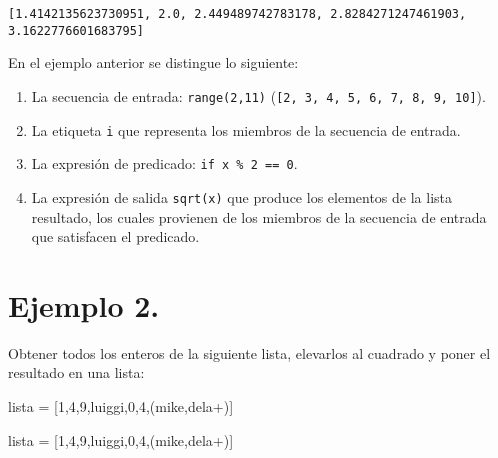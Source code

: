 \documentclass[
  letterpaper,
  DIV=11,
  numbers=noendperiod]{scrreprt}
\newenvironment{Shaded}{\begin{snugshade}}{\end{snugshade}}
\newcommand{\DecValTok}[1]{\textcolor[rgb]{0.68,0.00,0.00}{#1}}
\newcommand{\NormalTok}[1]{\textcolor[rgb]{0.00,0.23,0.31}{#1}}
\newcommand{\OperatorTok}[1]{\textcolor[rgb]{0.37,0.37,0.37}{#1}}
\newcommand{\StringTok}[1]{\textcolor[rgb]{0.13,0.47,0.30}{#1}}
\begin{document}
\begin{verbatim}
[1.4142135623730951, 2.0, 2.449489742783178, 2.8284271247461903, 3.1622776601683795]
\end{verbatim}

En el ejemplo anterior se distingue lo siguiente:

\begin{enumerate}
\def\labelenumi{\arabic{enumi}.}
\item
  La secuencia de entrada: \texttt{range(2,11)}
  (\texttt{{[}2,\ 3,\ 4,\ 5,\ 6,\ 7,\ 8,\ 9,\ 10{]}}).
\item
  La etiqueta \texttt{i} que representa los miembros de la secuencia de
  entrada.
\item
  La expresión de predicado: \texttt{if\ x\ \%\ 2\ ==\ 0}.
\item
  La expresión de salida \texttt{sqrt(x)} que produce los elementos de
  la lista resultado, los cuales provienen de los miembros de la
  secuencia de entrada que satisfacen el predicado.
\end{enumerate}

\section{\texorpdfstring{\textbf{Ejemplo
2.}}{Ejemplo 2.}}\label{ejemplo-2.-2}

Obtener todos los enteros de la siguiente lista, elevarlos al cuadrado y
poner el resultado en una lista:

\begin{Shaded}
\begin{Highlighting}[]
\NormalTok{    lista }\OperatorTok{=}\NormalTok{ [}\DecValTok{1}\NormalTok{,}\StringTok{\textquotesingle{}4\textquotesingle{}}\NormalTok{,}\DecValTok{9}\NormalTok{,}\StringTok{\textquotesingle{}luiggi\textquotesingle{}}\NormalTok{,}\DecValTok{0}\NormalTok{,}\DecValTok{4}\NormalTok{,(}\StringTok{\textquotesingle{}mike\textquotesingle{}}\NormalTok{,}\StringTok{\textquotesingle{}dela+\textquotesingle{}}\NormalTok{)]}
\end{Highlighting}
\end{Shaded}

\begin{Shaded}
\begin{Highlighting}[]
\NormalTok{lista }\OperatorTok{=}\NormalTok{ [}\DecValTok{1}\NormalTok{,}\StringTok{\textquotesingle{}4\textquotesingle{}}\NormalTok{,}\DecValTok{9}\NormalTok{,}\StringTok{\textquotesingle{}luiggi\textquotesingle{}}\NormalTok{,}\DecValTok{0}\NormalTok{,}\DecValTok{4}\NormalTok{,(}\StringTok{\textquotesingle{}mike\textquotesingle{}}\NormalTok{,}\StringTok{\textquotesingle{}dela+\textquotesingle{}}\NormalTok{)]}
\end{Highlighting}
\end{Shaded}
\end{document}

